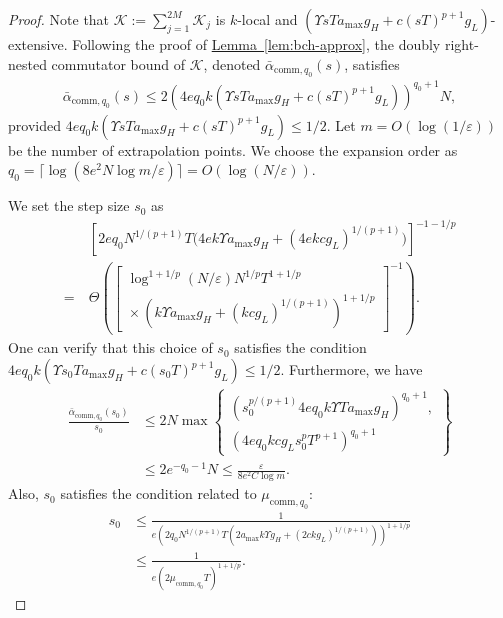 \documentclass[aps,pra,reprint,groupedaddress,floatfix]{revtex4-2}
\newcommand{\lem}[1]{\hyperref[lem:#1]{Lemma~\ref*{lem:#1}}}
\newcommand{\eps}{\varepsilon}
\newcommand{\mc}{\mathcal}
\begin{document}
\begin{proof}
    Note that $\mc K:= \sum_{j=1}^{2M} {\mc K}_j$ is $k$-local and $(\Upsilon sT a_{\max}g_H+c(sT)^{p+1} g_L)$-extensive.
    Following the proof of \lem{bch-approx}, the doubly right-nested commutator bound of $\mc K$, denoted $\bar{\alpha}_{\mathrm{comm}, q_0}(s)$, satisfies 
    \begin{align*}
        \bar{\alpha}_{\mathrm{comm}, q_0}(s) \le 2(4eq_0 k(\Upsilon sT a_{\max}g_H+c(sT)^{p+1} g_L))^{q_0+1}N,
    \end{align*}
    provided $4eq_0 k(\Upsilon sT a_{\max}g_H+c(sT)^{p+1} g_L) \le 1/2$. 
    Let $m=O(\log(1/\eps))$ be the number of extrapolation points. We choose the expansion order as $q_0 = \lceil \log(8e^2N\log m/\eps) \rceil = O(\log(N/\eps))$. 
    
    We set the step size $s_0$ as
    \begin{align}
    \label{eq:s0-def}
        &
        \left[
        2eq_0 N^{1/(p+1)}T
        \bigl(4ek \Upsilon a_{\max} g_H
        +(4ekcg_L )^{1/(p+1)}\bigr)
        \right]^{-1-1/p} \\
        =~&
        \Theta\left(
        \left[
        \begin{gathered}
        \log^{1+1/p}(N/\eps)N^{1/p}T^{1+1/p}\\
        {}\times
        (k\Upsilon a_{\max} g_H +(kcg_L)^{1/(p+1)})^{1+1/p}
        \end{gathered}
        \right]^{-1}
        \right).\nonumber
    \end{align}
    One can verify that this choice of $s_0$ satisfies the condition $4eq_0 k(\Upsilon s_0T a_{\max}g_H+c(s_0T)^{p+1} g_L) \le 1/2$.
    Furthermore, we have
    \begin{align*}
         \frac{\bar{\alpha}_{\mathrm{comm}, q_0}(s_0)}{s_0}
         &\le
         2N\max\left\{
         \begin{gathered}
         (s_0^{p/(p+1)}4eq_0k\Upsilon T a_{\max} g_H)^{q_0+1},\\
         (4eq_0kcg_L s_0 ^pT^{p+1})^{q_0+1}
         \end{gathered}
         \right\} \\
         &\le 2e^{-q_0-1}N \le \frac{\eps}{8e^2C \log m}.
    \end{align*}
    Also, $s_0$ satisfies the condition related to $\mu_{\mathrm{comm}, q_0}$:
    \begin{align*}
        s_0
        &\le
        \frac{1}{
        e(2q_0 N^{1/(p+1)}T
        (2a_{\max}k\Upsilon g_H+(2ckg_L)^{1/(p+1)}))^{1+1/p}
        }\\
        &\le
        \frac{1}{e(2\mu_{\mathrm{comm}, q_0}T)^{1+1/p}}.
    \end{align*}
    

\end{proof}
\end{document}
